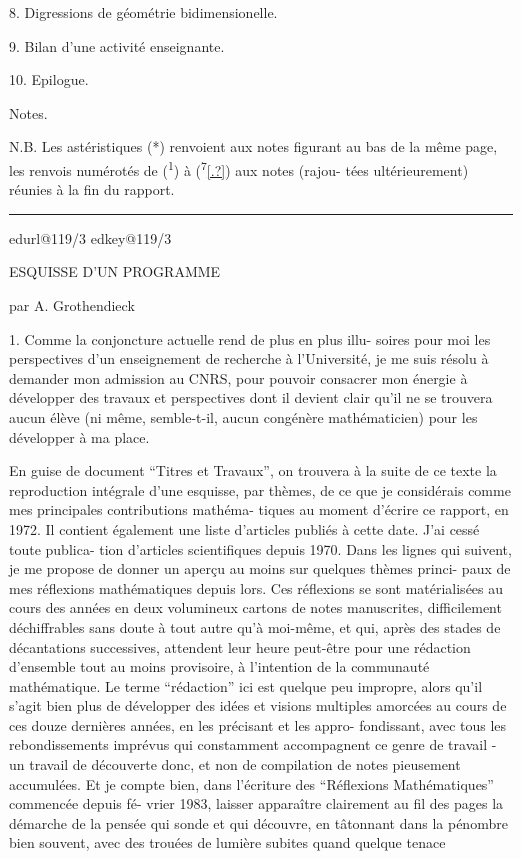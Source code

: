 \documentclass[11pt,a4paper]{article}
\makeatletter
\newif\ifdiplomatic
\newif\ifreading
\def\CurrentScanURL{}
\def\CurrentPageKey{}
\def\CurrentApparatus{}
\newcommand{\scanpage}[1]{%
  \clearpage
  \expandafter\let\expandafter\CurrentScanURL\csname edurl@#1\endcsname
  \expandafter\let\expandafter\CurrentPageKey\csname edkey@#1\endcsname
  \def\CurrentApparatus{}%
  \hypertarget{scan-\CurrentPageKey}{}%
  \typeout{EDITION-SCAN: \CurrentPageKey; PDFPAGE: \the\numexpr\ReadonlyShipoutCounter+1\relax}%
  \ifreading
    \marginnote{\raggedright\scriptsize\sffamily\href{\CurrentScanURL}{119 / \csname edpage@#1\endcsname}}%
  \else
    \noindent{\small\sffamily\href{\CurrentScanURL}{[scan #1]}}\par\smallskip
  \fi}
\newcommand{\mspage}[1]{%
  \ifreading\marginnote{\raggedright\scriptsize\sffamily p.\,#1}[2\baselineskip]%
  \else\noindent{\small\sffamily[p.\,#1]}\par\smallskip\fi}
\newcommand{\hand}[1]{\ifdiplomatic\textcolor{HandInk}{#1}\else#1\fi}
\newcommand{\unsure}[1]{\href{\CurrentScanURL}{[#1?]}}
\newcommand{\finishscan}{\ifx\CurrentApparatus\empty\else\par\bigskip\noindent\rule{.35\linewidth}{.35pt}\par\smallskip{\footnotesize\setlength{\parskip}{3pt}\CurrentApparatus}\fi}
\makeatother
\begin{document}
8. Digressions de géométrie bidimensionelle.

9. Bilan d'une activité enseignante.

10. Epilogue.

Notes.

N.B. Les astéristiques (*) renvoient aux notes figurant au bas de
la même page, les renvois numérotés de (\textsuperscript{\hand{1}}) à (\textsuperscript{\hand{7}}\unsure{.}) aux notes (rajou-%
tées ultérieurement) réunies à la fin du rapport.

\mspage{\hand{2}}

\finishscan
\scanpage{119/3}
\mspage{1}

ESQUISSE D'UN PROGRAMME

par A. Grothendieck

1. Comme la conjoncture actuelle rend de plus en plus illu-%
soires pour moi les perspectives d'un enseignement de recherche à
l'Université, je me suis résolu à demander mon admission au CNRS, pour
pouvoir consacrer mon énergie à développer des travaux et perspectives
dont il devient clair qu'il ne se trouvera aucun élève (ni même,
semble-t-il, aucun congénère mathématicien) pour les développer à ma
place.

En guise de document ``Titres et Travaux'', on trouvera à la
suite de ce texte la reproduction intégrale d'une esquisse, par thèmes,
de ce que je considérais comme mes principales contributions mathéma-%
tiques au moment d'écrire ce rapport, en 1972. Il contient également
une liste d'articles publiés à cette date. J'ai cessé toute publica-%
tion d'articles scientifiques depuis 1970. Dans les lignes qui suivent,
je me propose de donner un aperçu au moins sur quelques thèmes princi-%
paux de mes réflexions mathématiques depuis lors. Ces réflexions se
sont matérialisées au cours des années en deux volumineux cartons de
notes manuscrites, difficilement déchiffrables sans doute à tout autre
qu'à moi-même, et qui, après des stades de décantations successives,
attendent leur heure peut-être pour une rédaction d'ensemble tout au
moins provisoire, à l'intention de la communauté mathématique. Le
terme ``rédaction'' ici est quelque peu impropre, alors qu'il s'agit
bien plus de développer des idées et visions multiples amorcées au
cours de ces douze dernières années, en les précisant et les appro-%
fondissant, avec tous les rebondissements imprévus qui constamment
accompagnent ce genre de travail - un travail de découverte donc, et
non de compilation de notes pieusement accumulées. Et je compte bien,
dans l'écriture des ``Réflexions Mathématiques'' commencée depuis fé-%
vrier 1983, laisser apparaître clairement au fil des pages la démarche
de la pensée qui sonde et qui découvre, en tâtonnant dans la pénombre
bien souvent, avec des trouées de lumière subites quand quelque tenace
\end{document}
